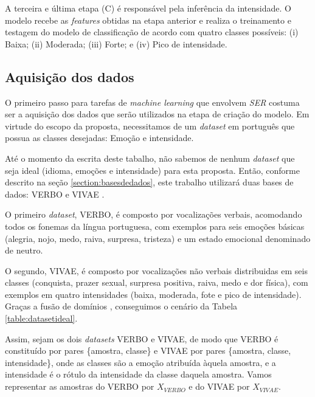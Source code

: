 A terceira e última etapa (C) é responsável pela inferência da intensidade. O modelo recebe as \textit{features} obtidas na etapa anterior e realiza o treinamento e testagem do modelo de classificação de acordo com quatro classes possíveis: (i) Baixa; (ii) Moderada; (iii) Forte; e (iv) Pico de intensidade.

\subsection{Aquisição dos dados}

O primeiro passo para tarefas de \textit{machine learning} que envolvem \textit{SER} costuma ser a aquisição dos dados que serão utilizados na etapa de criação do modelo. Em virtude do escopo da proposta, necessitamos de um \textit{dataset} em português que possua as classes desejadas: Emoção e intensidade.

Até o momento da escrita deste tabalho, não sabemos de nenhum \textit{dataset} que seja ideal (idioma, emoções e intensidade) para esta proposta. Então, conforme descrito na seção \ref{section:basesdedados}, este trabalho utilizará duas bases de dados: VERBO \cite{12.21} e VIVAE \cite{16}.

O primeiro \textit{dataset}, VERBO, é composto por vocalizações verbais, acomodando todos os fonemas da língua portuguesa, com exemplos para seis emoções básicas (alegria, nojo, medo, raiva, surpresa, tristeza) e um estado emocional denominado de neutro.

O segundo, VIVAE, é composto por vocalizações não verbais distribuidas em seis classes (conquista, prazer sexual, surpresa positiva, raiva, medo e dor física), com exemplos em quatro intensidades (baixa, moderada, fote e pico de intensidade). Graças a fusão de domínios \cite{49}, conseguimos o cenário da Tabela \ref{table:datasetideal}.

Assim, sejam os dois \textit{datasets} VERBO e VIVAE, de modo que VERBO é constituído por pares \{amostra, classe\} e VIVAE por pares \{amostra, classe, intensidade\}, onde as classes são a emoção atribuída àquela amostra, e a intensidade é o rótulo da intensidade da classe daquela amostra. Vamos representar as amostras do VERBO por $X_{VERBO}$ e do VIVAE por $X_{VIVAE}$.

